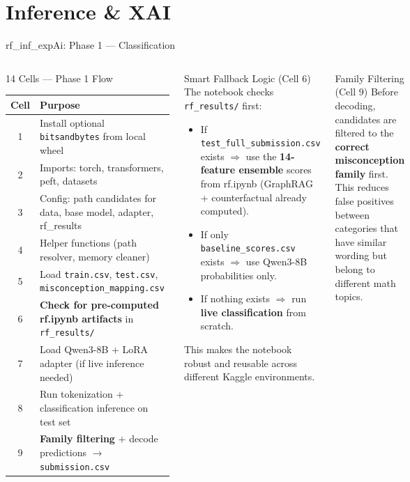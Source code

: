 ﻿\documentclass[aspectratio=169,10pt]{beamer}
\begin{document}
\section{Inference \& XAI}

\begin{frame}[shrink=4]{rf\_inf\_expAi: Phase 1 --- Classification}
\begin{columns}[T]
\begin{block}{14 Cells --- Phase 1 Flow}
\footnotesize
\begin{tabular}{cp{6.5cm}}
\toprule
\textbf{Cell} & \textbf{Purpose}\\
\midrule
1 & Install optional \texttt{bitsandbytes} from local wheel\\
2 & Imports: torch, transformers, peft, datasets\\
3 & Config: path candidates for data, base model, adapter, rf\_results\\
4 & Helper functions (path resolver, memory cleaner)\\
5 & Load \texttt{train.csv}, \texttt{test.csv}, \texttt{misconception\_mapping.csv}\\
6 & \textbf{Check for pre-computed rf.ipynb artifacts} in \texttt{rf\_results/}\\
7 & Load Qwen3-8B + LoRA adapter (if live inference needed)\\
8 & Run tokenization + classification inference on test set\\
9 & \textbf{Family filtering} $+$ decode predictions $\rightarrow$ \texttt{submission.csv}\\
\bottomrule
\end{tabular}
\end{block}
\begin{block}{Smart Fallback Logic (Cell 6)}
The notebook checks \texttt{rf\_results/} first:
\begin{itemize}
  \item If \texttt{test\_full\_submission.csv} exists $\Rightarrow$ use the \textbf{14-feature ensemble} scores from rf.ipynb (GraphRAG + counterfactual already computed).
  \item If only \texttt{baseline\_scores.csv} exists $\Rightarrow$ use Qwen3-8B probabilities only.
  \item If nothing exists $\Rightarrow$ run \textbf{live classification} from scratch.
\end{itemize}
This makes the notebook robust and reusable across different Kaggle environments.
\end{block}
\vspace{6pt}
\begin{block}{Family Filtering (Cell 9)}
Before decoding, candidates are filtered to the \textbf{correct misconception family} first. This reduces false positives between categories that have similar wording but belong to different math topics.
\end{block}
\end{columns}
\end{frame}
\end{document}
